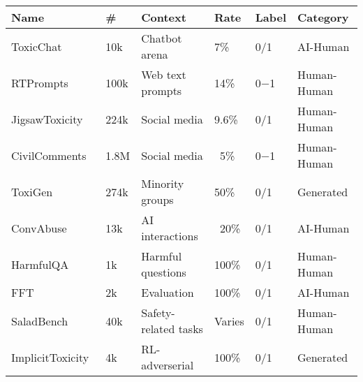 \begin{tabular}{@{}p{5.41cm}p{0.55cm}p{2.69cm}p{0.6cm}p{0.5cm}p{2.25cm}@{}}
\toprule
\textbf{Name} & \textbf{\#} & \textbf{Context} & \textbf{Rate} & \textbf{Label} & \textbf{Category} \\
\midrule
ToxicChat~\cite{ToxicChat} & 10k & Chatbot arena & 7\% & 0/1 & AI-Human \\
\midrule
RTPrompts~\cite{rtp} & 100k & Web text prompts & 14\% & 0$-$1 & Human-Human \\
\midrule
JigsawToxicity~\cite{jigsaw} & 224k & Social media & 9.6\% & 0/1 & Human-Human \\
\midrule
CivilComments~\cite{civilcomments} & 1.8M & Social media & ~5\% & 0$-$1 & Human-Human \\
\midrule
ToxiGen~\cite{hartvigsen2022toxigenlargescalemachinegenerateddataset} & 274k & Minority groups & 50\% & 0/1 & Generated \\
\midrule
ConvAbuse~\cite{cercas-curry-etal-2021-convabuse} & 13k & AI interactions & ~20\% & 0/1 & AI-Human \\
\midrule
HarmfulQA~\cite{bhardwaj2023redteaming} & 1k & Harmful questions & 100\% & 0/1 & Human-Human \\
\midrule
FFT~\cite{cui2024fftharmlessnessevaluationanalysis} & 2k & Evaluation & 100\% & 0/1 & AI-Human   \\
\midrule
SaladBench~\cite{li2024salad} & 40k & Safety-related tasks & Varies & 0/1 & Human-Human \\
\midrule
ImplicitToxicity~\cite{wen2023unveilingimplicittoxicitylarge} & 4k & RL-adverserial & 100\% & 0/1 & Generated \\
\bottomrule
\end{tabular}